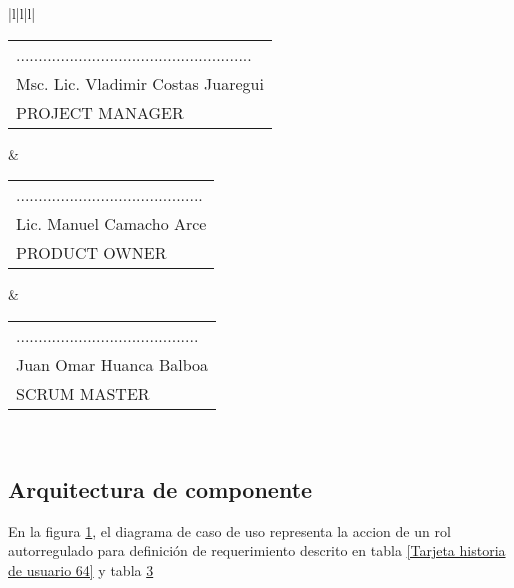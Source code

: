 \begin{table}[H]
\begin{tabular}{|l|l|l|}
 \\ \hline\begin{tabular}[c]{@{}l@{}}.....................................................\\ Msc. Lic. Vladimir Costas Juaregui\\ PROJECT MANAGER\end{tabular} & \begin{tabular}[c]{@{}l@{}}..........................................\\ Lic. Manuel Camacho Arce\\ PRODUCT OWNER\end{tabular} & \begin{tabular}[c]{@{}l@{}}.........................................\\ Juan Omar Huanca Balboa\\ SCRUM MASTER\end{tabular} \\ \hline
\end{tabular}
\label{Tarjeta historia de usuario 66}
\end{table}

\subsection{Arquitectura de componente}

En la figura \ref{fig:Diagrama de caso de uso para glosario y subtitulado},
el diagrama de caso de uso representa la accion de un rol autorregulado
para definición de requerimiento descrito en tabla
\ref{Tarjeta historia de usuario 64} y tabla
\ref{Tarjeta historia de usuario 66}

\begin{figure}[H]
	\centering
	\label{fig:Diagrama de caso de uso para glosario y subtitulado}
\end{figure}

